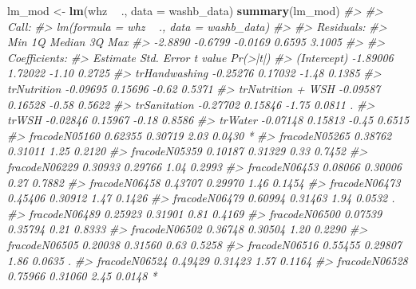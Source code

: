 \documentclass[12pt, krantz2,]{book}
\newenvironment{Shaded}{\begin{snugshade}}{\end{snugshade}}
\newcommand{\CommentTok}[1]{\textcolor[rgb]{0.56,0.35,0.01}{\textit{#1}}}
\newcommand{\DataTypeTok}[1]{\textcolor[rgb]{0.13,0.29,0.53}{#1}}
\newcommand{\KeywordTok}[1]{\textcolor[rgb]{0.13,0.29,0.53}{\textbf{#1}}}
\newcommand{\NormalTok}[1]{#1}
\newcommand{\OperatorTok}[1]{\textcolor[rgb]{0.81,0.36,0.00}{\textbf{#1}}}
\newcommand{\StringTok}[1]{\textcolor[rgb]{0.31,0.60,0.02}{#1}}
\theoremstyle{definition}
\theoremstyle{definition}
\theoremstyle{definition}
\newcommand{\1}{\mathbbm{1}}
\begin{document}
\begin{Shaded}
\begin{Highlighting}[]
\NormalTok{lm_mod <-}\StringTok{ }\KeywordTok{lm}\NormalTok{(whz }\OperatorTok{~}\StringTok{ }\NormalTok{., }\DataTypeTok{data =}\NormalTok{ washb_data)}
\KeywordTok{summary}\NormalTok{(lm_mod)}
\CommentTok{#> }
\CommentTok{#> Call:}
\CommentTok{#> lm(formula = whz ~ ., data = washb_data)}
\CommentTok{#> }
\CommentTok{#> Residuals:}
\CommentTok{#>     Min      1Q  Median      3Q     Max }
\CommentTok{#> -2.8890 -0.6799 -0.0169  0.6595  3.1005 }
\CommentTok{#> }
\CommentTok{#> Coefficients:}
\CommentTok{#>                                 Estimate Std. Error t value Pr(>|t|)   }
\CommentTok{#> (Intercept)                     -1.89006    1.72022   -1.10   0.2725   }
\CommentTok{#> trHandwashing                   -0.25276    0.17032   -1.48   0.1385   }
\CommentTok{#> trNutrition                     -0.09695    0.15696   -0.62   0.5371   }
\CommentTok{#> trNutrition + WSH               -0.09587    0.16528   -0.58   0.5622   }
\CommentTok{#> trSanitation                    -0.27702    0.15846   -1.75   0.0811 . }
\CommentTok{#> trWSH                           -0.02846    0.15967   -0.18   0.8586   }
\CommentTok{#> trWater                         -0.07148    0.15813   -0.45   0.6515   }
\CommentTok{#> fracodeN05160                    0.62355    0.30719    2.03   0.0430 * }
\CommentTok{#> fracodeN05265                    0.38762    0.31011    1.25   0.2120   }
\CommentTok{#> fracodeN05359                    0.10187    0.31329    0.33   0.7452   }
\CommentTok{#> fracodeN06229                    0.30933    0.29766    1.04   0.2993   }
\CommentTok{#> fracodeN06453                    0.08066    0.30006    0.27   0.7882   }
\CommentTok{#> fracodeN06458                    0.43707    0.29970    1.46   0.1454   }
\CommentTok{#> fracodeN06473                    0.45406    0.30912    1.47   0.1426   }
\CommentTok{#> fracodeN06479                    0.60994    0.31463    1.94   0.0532 . }
\CommentTok{#> fracodeN06489                    0.25923    0.31901    0.81   0.4169   }
\CommentTok{#> fracodeN06500                    0.07539    0.35794    0.21   0.8333   }
\CommentTok{#> fracodeN06502                    0.36748    0.30504    1.20   0.2290   }
\CommentTok{#> fracodeN06505                    0.20038    0.31560    0.63   0.5258   }
\CommentTok{#> fracodeN06516                    0.55455    0.29807    1.86   0.0635 . }
\CommentTok{#> fracodeN06524                    0.49429    0.31423    1.57   0.1164   }
\CommentTok{#> fracodeN06528                    0.75966    0.31060    2.45   0.0148 * }

\end{Highlighting}
\end{Shaded}
\end{document}
